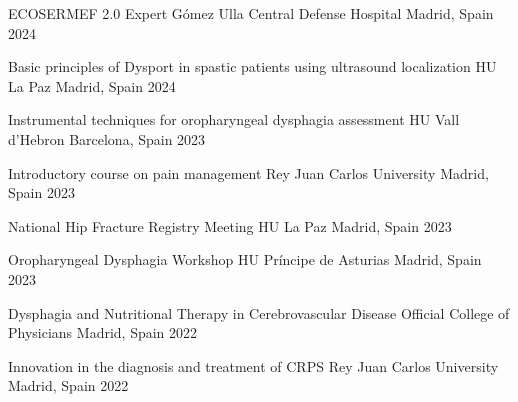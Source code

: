 

\begin{cventries}

  \cventry
    {ECOSERMEF 2.0 Expert} %
    {Gómez Ulla Central Defense Hospital} %
    {Madrid, Spain} %
    {2024} %
    {}

  \cventry
    {Basic principles of Dysport in spastic patients using ultrasound localization} %
    {HU La Paz} %
    {Madrid, Spain} %
    {2024} %
    {}

  \cventry
    {Instrumental techniques for oropharyngeal dysphagia assessment} %
    {HU Vall d'Hebron} %
    {Barcelona, Spain} %
    {2023} %
    {}

  \cventry
    {Introductory course on pain management} %
    {Rey Juan Carlos University} %
    {Madrid, Spain} %
    {2023} %
    {}

  \cventry
    {National Hip Fracture Registry Meeting} %
    {HU La Paz} %
    {Madrid, Spain} %
    {2023} %
    {}

  \cventry
    {Oropharyngeal Dysphagia Workshop} %
    {HU Príncipe de Asturias} %
    {Madrid, Spain} %
    {2023} %
    {}

  \cventry
    {Dysphagia and Nutritional Therapy in Cerebrovascular Disease} %
    {Official College of Physicians} %
    {Madrid, Spain} %
    {2022} %
    {}

  \cventry
    {Innovation in the diagnosis and treatment of CRPS} %
    {Rey Juan Carlos University} %
    {Madrid, Spain} %
    {2022} %
    {}


\end{cventries}
